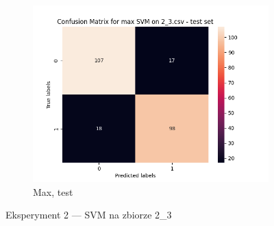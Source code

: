 \documentclass[12pt]{article}
\newcommand*{\subfigwidth}{0.24\textwidth}
\begin{document}
\begin{figure}[H]
\begin{subfigure}[t]{\subfigwidth}
        \includegraphics[width=\linewidth]{img/exp_2/svm/2_3/max/test_matrix.png}
        \caption{Max, test}
    \end{subfigure} 
    
    \caption{Eksperyment 2 --- SVM na zbiorze 2\_3}\label{fig:figure13}
\end{figure}

\clearpage
\end{document}

